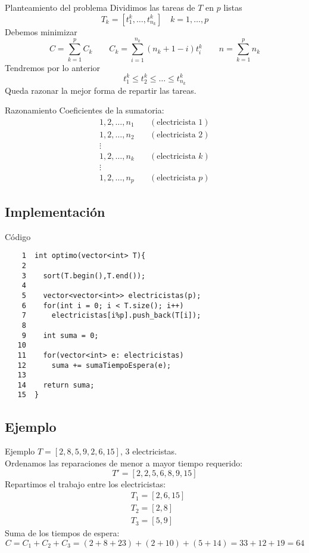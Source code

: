 \documentclass[serif,9pt]{beamer}
\begin{document}
\begin{frame}{Planteamiento del problema}
  Dividimos las tareas de $T$ en $p$ listas
  \[T_k=[t^k_1,\ldots,t^k_{n_k}] \quad k=1,\ldots,p\]
  \pause
  Debemos minimizar
  \[C=\sum_{k=1}^pC_k \qquad C_k=\sum_{i=1}^{n_k}(n_k+1-i)t_i^k \qquad
    n=\sum_{k=1}^pn_k\]
  \pause
  Tendremos por lo anterior
  \[t_1^k \leq t_2^k \leq \ldots \leq t_{n_k}^k\]
  Queda razonar la mejor forma de repartir las tareas.
\end{frame}

\begin{frame}{Razonamiento}
  Coeficientes de la sumatoria:
  \begin{align*}
    1,2,\ldots,n_1 \quad& (\text{electricista }1)\\
    1,2,\ldots,n_2 \quad& (\text{electricista }2)\\
    \vdots& \\
    1,2,\ldots,n_k \quad& (\text{electricista }k)\\
    \vdots& \\
    1,2,\ldots,n_p \quad& (\text{electricista }p)
  \end{align*}
\end{frame}

\subsection{Implementación}

\begin{frame}[fragile]{Código}
\begin{verbatim}
    1  int optimo(vector<int> T){
    2    
    3    sort(T.begin(),T.end());
    4  
    5    vector<vector<int>> electricistas(p);
    6    for(int i = 0; i < T.size(); i++)
    7      electricistas[i%p].push_back(T[i]);
    8  
    9    int suma = 0;
   10  
   11    for(vector<int> e: electricistas)
   12      suma += sumaTiempoEspera(e);
   13  
   14    return suma;
   15  }
\end{verbatim}
\end{frame}

\subsection{Ejemplo}

\begin{frame}{Ejemplo}
  $T=[2, 8, 5, 9, 2, 6, 15]$, 3 electricistas. \\
  \pause
  \vspace{5mm}
  Ordenamos las reparaciones de menor a mayor tiempo requerido:
  \[T'=[2, 2, 5, 6, 8, 9, 15]\]
  \pause
  Repartimos el trabajo entre los electricistas:
  \begin{align*}
    &T_1=[2,6,15] \\
    &T_2=[2,8] \\
    &T_3=[5,9]
  \end{align*}
  \pause
  Suma de los tiempos de espera:
  \[C=C_1+C_2+C_3=(2+8+23)+(2+10)+(5+14)=33+12+19=64\]
\end{frame}
\end{document}
